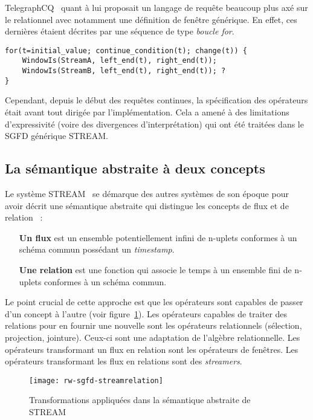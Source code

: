 TelegraphCQ~\cite{Chandrasekaran:telegraphcq} quant à lui proposait un langage de requête beaucoup plus axé sur le relationnel avec notamment une définition de fenêtre générique. En effet, ces dernières étaient décrites par une séquence de type \textit{boucle for}.
\begin{center}
\begin{minipage}[c]{0.75\textwidth}
\begin{verbatim}
for(t=initial_value; continue_condition(t); change(t)) {
    WindowIs(StreamA, left_end(t), right_end(t));
    WindowIs(StreamB, left_end(t), right_end(t)); ?
}
\end{verbatim}
\end{minipage}
\end{center}

Cependant, depuis le début des requêtes continues, la spécification des opérateurs était avant tout dirigée par l'implémentation. Cela a amené à des limitations d'expressivité (voire des divergences d'interprétation) qui ont été traitées dans le SGFD générique STREAM.

\subsection{La sémantique abstraite à deux concepts}\label{sec:rw:sgfd:modeles:stream}
Le système STREAM~\cite{Widom:queries, Arasu:stream} se démarque des autres systèmes de son époque pour avoir décrit une sémantique abstraite qui distingue les concepts de flux et de relation~\cite{Arasu:semantic} :
\begin{itemize}
 \item[\textbf{Un flux}] est un ensemble potentiellement infini de n-uplets conformes à un schéma commun possédant un \textit{timestamp}.
 \item[\textbf{Une relation}] est une fonction qui associe le temps à un ensemble fini de n-uplets conformes à un schéma commun.
\end{itemize}
Le point crucial de cette approche est que les opérateurs sont capables de passer d'un concept à l'autre (voir figure~\ref{fig:rw:sgfd:streamrelation}). Les opérateurs capables de traiter des relations pour en fournir une nouvelle sont les opérateurs relationnels (sélection, projection, jointure). Ceux-ci sont une adaptation de l'algèbre relationnelle. Les opérateurs transformant un flux en relation sont les opérateurs de fenêtres. Les opérateurs transformant les flux en relations sont des \textit{streamers}.
\begin{figure}[ht]
    \centering
    \texttt{[image: rw-sgfd-streamrelation]}
    \caption{Transformations appliquées dans la sémantique abstraite de STREAM}\label{fig:rw:sgfd:streamrelation}
\end{figure}

